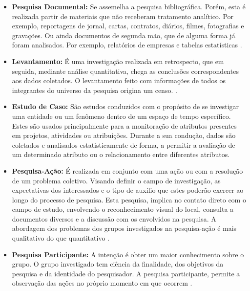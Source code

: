 \begin{itemize}
\begin{itemize}
			\item \textbf{Pesquisa Documental:} Se assemelha a pesquisa bibliográfica. Porém, esta é realizada partir de materiais que não receberam tratamento analítico. Por exemplo, reportagens de jornal, cartas, contratos, diários, filmes, fotografias e gravações. Ou ainda documentos de segunda mão, que de alguma forma já foram analisados. Por exemplo, relatórios de empresas e tabelas estatísticas \cite{Gil:2010}.

			\item \textbf{Levantamento:} É uma investigação realizada em retrospecto, que em seguida, mediante análise quantitativa, chega as conclusões correspondentes aos dados coletados. O levantamento feito com informações de todos os integrantes do universo da pesquisa origina um censo. \cite{Mafra:Travassos:2006}.
			
			\item \textbf{Estudo de Caso:} São estudos conduzidos com o propósito de se investigar uma entidade ou um fenômeno dentro de um espaço de tempo específico. Estes são usados principalmente para a monitoração de atributos presentes em projetos, atividades ou atribuições. Durante a sua condução, dados são coletados e analisados estatisticamente de forma, a permitir a avaliação de um determinado atributo ou o relacionamento entre diferentes atributos. \cite{Mafra:Travassos:2006}
			
			\item \textbf{Pesquisa-Ação:} É realizada em conjunto com uma ação ou com a resolução de um problema coletivo. Visando definir o campo de investigação, as expectativas dos interessados e o tipo de auxílio que estes poderão exercer ao longo do processo de pesquisa. Esta pesquisa, implica no contato direto com o campo de estudo, envolvendo o reconhecimento visual do local, consulta a documentos diversos e a discussão com os envolvidos na pesquisa. A abordagem dos problemas dos grupos investigados na pesquisa-ação é mais qualitativo do que quantitativo \cite{Silva:Tafner:2007}.
			
			\item \textbf{Pesquisa Participante:} A intenção é obter um maior conhecimento sobre o grupo. O grupo investigado tem ciência da finalidade, dos objetivos da pesquisa e da identidade do pesquisador. A pesquisa participante, permite a observação das ações no próprio momento em que ocorrem \cite{Silva:Tafner:2007}.
			

\end{itemize}
\end{itemize}
